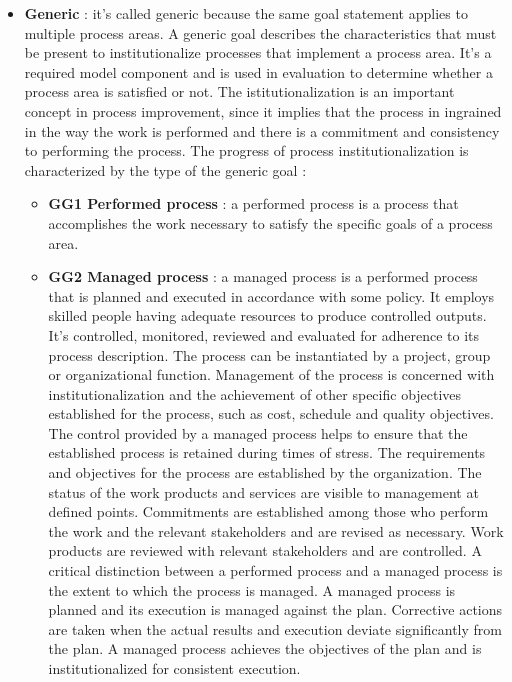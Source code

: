 \begin{itemize}
    \item \textbf{Generic} : it's called generic because the same goal statement applies to multiple process areas. A generic goal describes the characteristics that must be present to institutionalize processes that implement a process area. It's a required model component and is used in evaluation to determine whether a process area is satisfied or not. The istitutionalization is an important concept in process improvement, since it implies that the process in ingrained in the way the work is performed and there is a commitment and consistency to performing the process. The progress of process institutionalization is characterized by the type of the generic goal :
          \begin{itemize}
              \item \textbf{GG1 \- Performed process} : a performed process is a process that accomplishes the work necessary to satisfy the specific goals of a process area.
              \item \textbf{GG2 \- Managed process} : a managed process is a performed process that is planned and executed in accordance with some policy. It employs skilled people having adequate resources to produce controlled outputs. It's controlled, monitored, reviewed and evaluated for adherence to its process description. The process can be instantiated by a project, group or organizational function. Management of the process is concerned with institutionalization and the achievement of other specific objectives established for the process, such as cost, schedule and quality objectives. The control provided by a managed process helps to ensure that the established process is retained during times of stress. The requirements and objectives for the process are established by the organization. The status of the work products and services are visible to management at defined points. Commitments are established among those who perform the work and the relevant stakeholders and are revised as necessary. Work products are reviewed with relevant stakeholders and are controlled. A critical distinction between a performed process and a managed process is the extent to which the process is managed. A managed process is planned and its execution is managed against the plan. Corrective actions are taken when the actual results and execution deviate significantly from the plan. A managed process achieves the objectives of the plan and is institutionalized for consistent execution.

\end{itemize}
\end{itemize}

